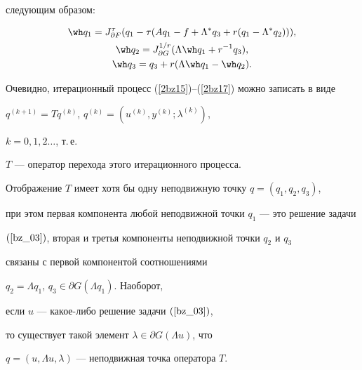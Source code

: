 следующим образом:


\begin{gather}


\wh q_1=J_{\partial F}^{\tau} ({q_1- \tau ({A q_1-f+\Lambda ^* q_3 +


r (q_1- \Lambda ^* q_2)})}), \label{bz_08_0}\\


%


\wh q_2=J_{\partial G}^{1/r} (\Lambda \wh q_1 +r^{-1} q_3), \label{bz_08}\\


%


\wh q_3=q_3+r ({\Lambda \wh q_1-\wh q_2}). 


\label{bz_09}


\end{gather}





Очевидно, итерационный процесс (\ref{2bz15})--(\ref{2bz17}) можно записать в виде


$q^{(k+1)}=Tq^{(k)}$, $q^{(k)}=(u^{(k)}, y^{(k)}; \lambda ^{(k)})$,


$ k=0,1,2\dotsc$, т.\,е.


$T$ --- оператор перехода этого итерационного процесса. 








\begin{thm}\label{bz_T3}


Отображение $T$ имеет хотя бы одну неподвижную точку $q=(q_1,q_2,q_3)$,


при этом первая компонента любой неподвижной точки $q_1$ --- это решение задачи 


$(\ref{bz_03})$, вторая и третья компоненты неподвижной точки $q_2$ и $q_3$ 


связаны с первой компонентой соотношениями 


$q_2=\Lambda q_1$, $q_3 \in \partial G(\Lambda q_1)$. Наоборот, 


если $u$ --- какое-либо решение задачи $(\ref{bz_03})$, 


то существует такой элемент $\lambda \in \partial G(\Lambda u)$, что 


$q=(u , \Lambda u , \lambda)$ --- неподвижная точка оператора $T$.


\end{thm}








